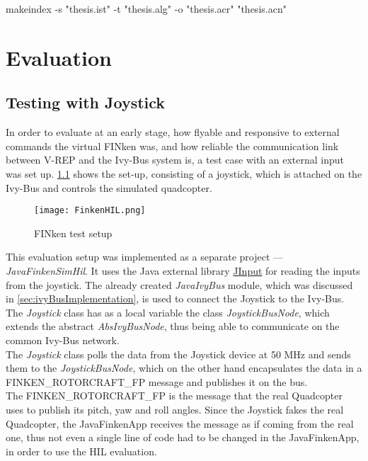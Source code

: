 makeindex  -s "thesis.ist" -t "thesis.alg" -o "thesis.acr" "thesis.acn"\chapter{Evaluation}
\label{chap:eval}
\section{Testing with Joystick}
\label{sec:evalJoystick}

In order to evaluate at an early stage, how flyable and responsive to external commands the virtual FINken was, and how reliable the communication link between  V-REP and the Ivy-Bus system is, a test case with an external input was set up. 
\ref{fig:finkenHIL} shows the  set-up, consisting of a joystick, which is attached on the Ivy-Bus and controls the simulated quadcopter.


\begin{figure}[h!]
 \begin{center}
  \texttt{[image: FinkenHIL.png]}
 \end{center}
  \caption{FINken test setup\label{fig:finkenHIL}}
\end{figure}

This evaluation setup was implemented as a separate project --- \textit{JavaFinkenSimHil}. 
It uses the Java external library \href{https://java.net/projects/jinput}{JInput} for reading the inputs from the joystick. 
The already created \textit{JavaIvyBus} module, which was discussed in \ref{sec:ivyBusImplementation}, is used to connect the Joystick to the Ivy-Bus. \\

The \textit{Joystick} class has as a local variable the class \textit{JoystickBusNode}, which extends the abstract \textit{AbsIvyBusNode}, thus being able to communicate on the common Ivy-Bus network. \\

The \textit{Joystick} class polls the data from the Joystick device at 50 MHz and sends them to the \textit{JoystickBusNode}, which on the other hand encapsulates the data in a FINKEN\_ROTORCRAFT\_FP message and publishes it on the bus. \\ 

The FINKEN\_ROTORCRAFT\_FP is the message that the real Quadcopter uses to publish its pitch, yaw and roll angles. 
Since the Joystick fakes the real Quadcopter, the JavaFinkenApp receives the message as if coming from the real one, thus not even a single line of code had to be changed in the JavaFinkenApp, in order to use the HIL evaluation. \\

